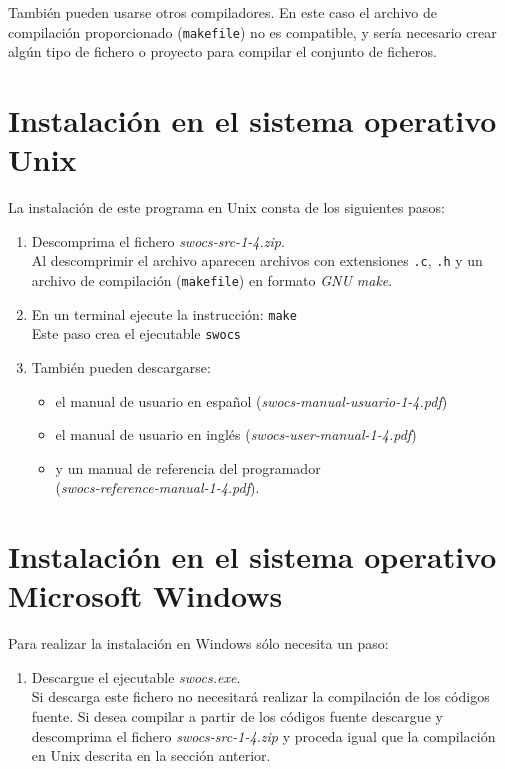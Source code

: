 \documentclass[a4paper,12pt]{report}
\begin{document}
También pueden usarse otros compiladores. En este caso el archivo de compilación
proporcionado ({\tt makefile}) no es compatible, y sería necesario crear algún
tipo de fichero o proyecto para compilar el conjunto de ficheros.


\section{Instalación en el sistema operativo Unix}

La instalación de este programa en Unix consta de los siguientes pasos:
  \begin{enumerate}
	\item Descomprima el fichero \emph{swocs-src-1-4.zip}. \\
		Al descomprimir el archivo aparecen archivos con extensiones {\tt .c},
		{\tt .h} y un archivo de compilación ({\tt makefile}) en formato
		\emph{GNU make}.
	\item En un terminal ejecute la instrucción: {\tt make} \\
			Este paso crea el ejecutable {\tt swocs} 
	\item También pueden descargarse:
		\begin{itemize}
			\item el manual de usuario en español
				({\it swocs-manual-usuario-1-4.pdf})
			\item el manual de usuario en inglés
				({\it swocs-user-manual-1-4.pdf})
			\item y un manual de referencia del programador\\
				({\it swocs-reference-manual-1-4.pdf}). 
		\end{itemize}
  \end{enumerate}

\section{Instalación en el sistema operativo Microsoft Windows}

Para realizar la instalación en Windows sólo necesita un paso: 
  \begin{enumerate}
	\item Descargue el ejecutable \emph{swocs.exe}. \\
		Si descarga este fichero no necesitará realizar la compilación de los
		códigos fuente. Si desea compilar a partir de los códigos fuente
		descargue y descomprima el fichero \emph{swocs-src-1-4.zip} y proceda
		igual que la compilación en Unix descrita en la sección anterior.
  \end{enumerate}
\end{document}
